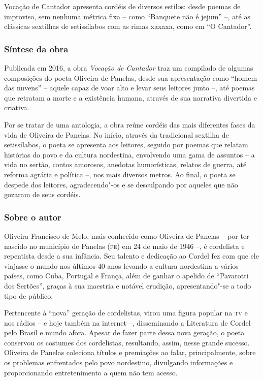 \documentclass{article}
\begin{document}
Vocação de Cantador apresenta cordéis de diversos estilos: desde poemas
de improviso, sem nenhuma métrica fixa -- como ``Banquete não é jejum''
--, até as clássicas sextilhas de setissílabos com as rimas xaxaxa, como
em ``O Cantador''.

\subsubsection{Síntese da obra}

Publicada em 2016, a obra \emph{Vocação de Cantador} traz um compilado
de algumas composições do poeta Oliveira de Panelas, desde sua
apresentação como ``homem das nuvens'' -- aquele capaz de voar alto e
levar seus leitores junto --, até poemas que retratam a morte e a
existência humana, através de sua narrativa divertida e criativa.

Por se tratar de uma antologia, a obra reúne cordéis das mais diferentes
fases da vida de Oliveira de Panelas. No início, através da tradicional
sextilha de setissílabos, o poeta se apresenta aos leitores, seguido por
poemas que relatam histórias do povo e da cultura nordestina, envolvendo
uma gama de assuntos -- a vida no sertão, contos amorosos, anedotas
humorísticas, relatos de guerra, até reforma agrária e política --, nos
mais diversos metros. Ao final, o poeta se despede dos leitores,
agradecendo"-os e se desculpando por aqueles que não gozaram de seus
cordéis.

\subsubsection{Sobre o autor}

Oliveira Francisco de Melo, mais conhecido como Oliveira de Panelas --
por ter nascido no município de Panelas (\textsc{pe}) em 24 de maio de 1946 --, é
cordelista e repentista desde a sua infância. Seu talento e dedicação ao
Cordel fez com que ele viajasse o mundo nos últimos 40 anos levando a
cultura nordestina a vários países, como Cuba, Portugal e França, além
de ganhar o apelido de ``Pavarotti dos Sertões'', graças à sua maestria
e notável erudição, apresentando"-se a todo tipo de público.

Pertencente à ``nova'' geração de cordelistas, virou uma figura popular
na \textsc{tv} e nos rádios -- e hoje também na internet --, disseminando a
Literatura de Cordel pelo Brasil e mundo afora. Apesar de fazer parte
dessa nova geração, o poeta conservou os costumes dos cordelistas,
resultando, assim, nesse grande sucesso. Oliveira de Panelas coleciona
títulos e premiações ao falar, principalmente, sobre os problemas
enfrentados pelo povo nordestino, divulgando informações e
proporcionando entretenimento a quem não tem acesso.
\end{document}

